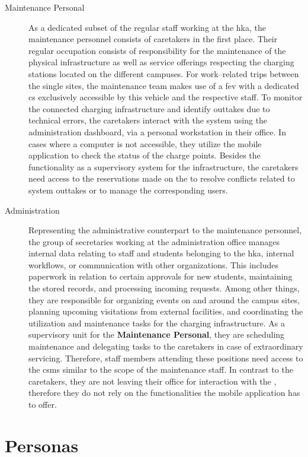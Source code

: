 \begin{description}
    \item[Maintenance Personal] As a dedicated subset of the regular staff working at the \acrshort{hka}, the maintenance personnel consists of caretakers in the first place. Their regular occupation consists of responsibility for the maintenance of the physical infrastructure as well as service offerings respecting the charging stations located on the different campuses.
    For work--related trips between the single sites, the maintenance team makes use of a \acrshort{fev} with a dedicated \acrshort{cs} exclusively accessible by this vehicle and the respective staff.
    To monitor the connected charging infrastructure and identify outtakes due to technical errors, the caretakers interact with the system using the administration dashboard, via a personal workstation in their office. In cases where a computer is not accessible, they utilize the mobile application to check the status of the charge points.
    Besides the functionality as a supervisory system for the infrastructure, the caretakers need access to the reservations made on the  to resolve conflicts related to system outtakes or to manage the corresponding users.
    \item[Administration] Representing the administrative counterpart to the maintenance personnel, the group of secretaries working at the administration office manages internal data relating to staff and students belonging to the \acrshort{hka}, internal workflows, or communication with other organizations. 
    This includes paperwork in relation to certain approvals for new students, maintaining the stored records, and processing incoming requests. Among other things, they are responsible for organizing events on and around the campus sites, planning upcoming visitations from external facilities, and coordinating the utilization and maintenance tasks for the charging infrastructure.
    As a supervisory unit for the \textbf{Maintenance Personal}, they are scheduling maintenance and delegating tasks to the caretakers in case of extraordinary servicing.  
    Therefore, staff members attending these positions need access to the \acrshort{csms} similar to the scope of the maintenance staff. In contrast to the caretakers, they are not leaving their office for interaction with the , therefore they do not rely on the functionalities the mobile application has to offer.
\end{description}

\section{Personas}
\label{ch:Requirements Engineering:sec:Personas}

